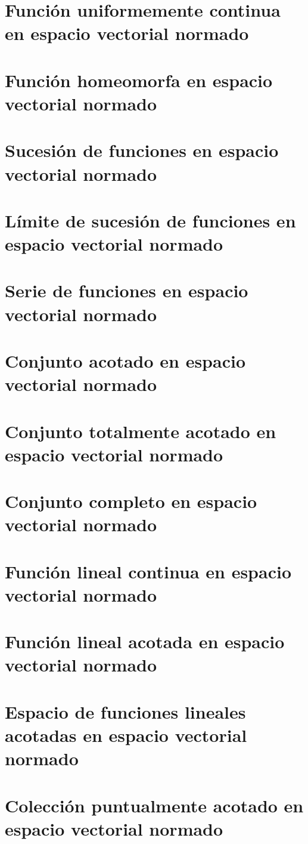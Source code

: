 \documentclass[a4paper]{scrbook}
\theoremstyle{definition}
\begin{document}
\section{Función uniformemente continua en espacio vectorial normado}
\section{Función homeomorfa en espacio vectorial normado}
\section{Sucesión de funciones en espacio vectorial normado}
\section{Límite de sucesión de funciones en espacio vectorial normado}
\section{Serie de funciones en espacio vectorial normado}
\section{Conjunto acotado en espacio vectorial normado}
\section{Conjunto totalmente acotado en espacio vectorial normado}
\section{Conjunto completo en espacio vectorial normado}
\section{Función lineal continua en espacio vectorial normado}
\section{Función lineal acotada en espacio vectorial normado}
\section{Espacio de funciones lineales acotadas en espacio vectorial normado}
\section{Colección puntualmente acotado en espacio vectorial normado}
\end{document}
